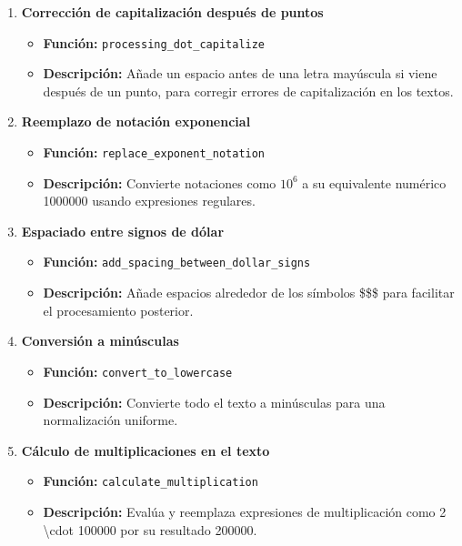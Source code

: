 \documentclass{article}
\begin{document}
\begin{enumerate}
    \item \textbf{Corrección de capitalización después de puntos}
          \begin{itemize}
              \item \textbf{Función:} \texttt{processing\_dot\_capitalize}
              \item \textbf{Descripción:} Añade un espacio antes de una letra mayúscula si viene después de un punto, para corregir errores de capitalización en los textos.
          \end{itemize}
    \item \textbf{Reemplazo de notación exponencial}
          \begin{itemize}
              \item \textbf{Función:} \texttt{replace\_exponent\_notation}
              \item \textbf{Descripción:} Convierte notaciones como $10^6$ a su equivalente numérico 1000000 usando expresiones regulares.
          \end{itemize}
    \item \textbf{Espaciado entre signos de dólar}
          \begin{itemize}
              \item \textbf{Función:} \texttt{add\_spacing\_between\_dollar\_signs}
              \item \textbf{Descripción:} Añade espacios alrededor de los símbolos \$\$\$ para facilitar el procesamiento posterior.
          \end{itemize}
    \item \textbf{Conversión a minúsculas}
          \begin{itemize}
              \item \textbf{Función:} \texttt{convert\_to\_lowercase}
              \item \textbf{Descripción:} Convierte todo el texto a minúsculas para una normalización uniforme.
          \end{itemize}
    \item \textbf{Cálculo de multiplicaciones en el texto}
          \begin{itemize}
              \item \textbf{Función:} \texttt{calculate\_multiplication}
              \item \textbf{Descripción:} Evalúa y reemplaza expresiones de multiplicación como 2 \textbackslash cdot 100000 por su resultado 200000.

\end{itemize}
\end{enumerate}
\end{document}
